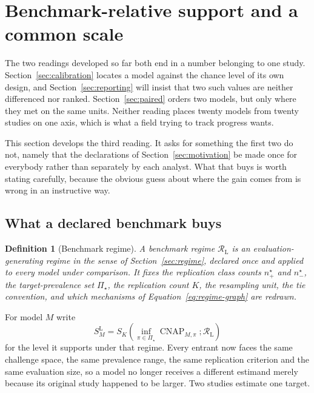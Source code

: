 \documentclass[11pt]{article}
\newcommand{\CNAP}{\operatorname{CNAP}}
\newcommand{\Regime}{\mathcal{R}}
\newcommand{\PSet}{\Pi_\star}
\newcommand{\RegimeL}{\Regime_{\mathrm{L}}}
\newcommand{\SLead}{S^{\mathrm{L}}}
\newtheorem{definition}{Definition}
\theoremstyle{remark}
\begin{document}
\section{Benchmark-relative support and a common scale}
\label{sec:leaderboard}

The two readings developed so far both end in a number belonging to one study. Section~\ref{sec:calibration} locates a model against the chance level of its own design, and Section~\ref{sec:reporting} will insist that two such values are neither differenced nor ranked. Section~\ref{sec:paired} orders two models, but only where they met on the same units. Neither reading places twenty models from twenty studies on one axis, which is what a field trying to track progress wants.

This section develops the third reading. It asks for something the first two do not, namely that the declarations of Section~\ref{sec:motivation} be made once for everybody rather than separately by each analyst. What that buys is worth stating carefully, because the obvious guess about where the gain comes from is wrong in an instructive way.

\subsection{What a declared benchmark buys}
\label{sec:benchmark-regime}

\begin{definition}[Benchmark regime]
\label{def:benchmark-regime}
A benchmark regime $\RegimeL$ is an evaluation-generating regime in the sense of Section~\ref{sec:regime}, declared once and applied to every model under comparison. It fixes the replication class counts $n^\star_+$ and $n^\star_-$, the target-prevalence set $\PSet$, the replication count $K$, the resampling unit, the tie convention, and which mechanisms of Equation~\eqref{eq:regime-graph} are redrawn.
\end{definition}

For model $M$ write
\begin{equation}
\SLead_M
=
S_K
\left(
\inf_{\pi\in\PSet}\CNAP_{M,\pi};
\RegimeL
\right)
\label{eq:leaderboard-raw}
\end{equation}
for the level it supports under that regime. Every entrant now faces the same challenge space, the same prevalence range, the same replication criterion and the same evaluation size, so a model no longer receives a different estimand merely because its original study happened to be larger. Two studies estimate one target.
\end{document}

